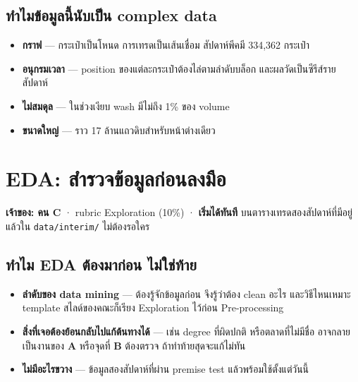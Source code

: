 \documentclass[11pt,a4paper]{article}
\newcommand{\en}[1]{#1}
\newcommand{\code}[1]{\texttt{#1}}
\newcommand{\stg}[2]{\textcolor{#1}{\textbf{\en{#2}}}}
\newcommand{\rA}{\stg{accent}{A}}
\newcommand{\rB}{\stg{alg}{B}}
\newcommand{\rC}{\stg{ext}{C}}
\begin{document}
\subsection{ทำไมข้อมูลนี้นับเป็น complex data}

\begin{itemize}
\item \textbf{กราฟ} --- กระเป๋าเป็นโหนด การเทรดเป็นเส้นเชื่อม
      สัปดาห์พีคมี 334,362 กระเป๋า
\item \textbf{อนุกรมเวลา} --- position ของแต่ละกระเป๋าต้องไล่ตามลำดับบล็อก
      และผลวัดเป็นซีรีส์รายสัปดาห์
\item \textbf{ไม่สมดุล} --- ในช่วงเงียบ wash มีไม่ถึง 1\% ของ volume
\item \textbf{ขนาดใหญ่} --- ราว 17 ล้านแถวดิบสำหรับหน้าต่างเดียว
\end{itemize}

\section{EDA: สำรวจข้อมูลก่อนลงมือ}
\label{sec:eda}

\textbf{เจ้าของ: คน \rC} · rubric Exploration (10\%) · \textbf{เริ่มได้ทันที}
บนตารางเทรดสองสัปดาห์ที่มีอยู่แล้วใน \code{data/interim/} ไม่ต้องรอใคร

\subsection{ทำไม EDA ต้องมาก่อน ไม่ใช่ท้าย}

\begin{itemize}
\item \textbf{ลำดับของ data mining} --- ต้องรู้จักข้อมูลก่อน จึงรู้ว่าต้อง clean อะไร
      และวิธีไหนเหมาะ template สไลด์ของคณะก็เรียง Exploration ไว้ก่อน Pre-processing
\item \textbf{สิ่งที่เจอต้องย้อนกลับไปแก้ต้นทางได้} --- เช่น degree ที่ผิดปกติ
      หรือตลาดที่ไม่มีชื่อ อาจกลายเป็นงานของ \rA{} หรือจุดที่ \rB{} ต้องตรวจ
      ถ้าทำท้ายสุดจะแก้ไม่ทัน
\item \textbf{ไม่มีอะไรขวาง} --- ข้อมูลสองสัปดาห์ที่ผ่าน premise test แล้วพร้อมใช้ตั้งแต่วันนี้
\end{itemize}
\end{document}
